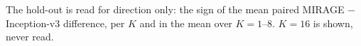 The hold-out is read for direction only: the sign of the mean paired MIRAGE $-$ Inception-v3 difference, per $K$ and in the mean over $K=1$--8. $K=16$ is shown, never read.
